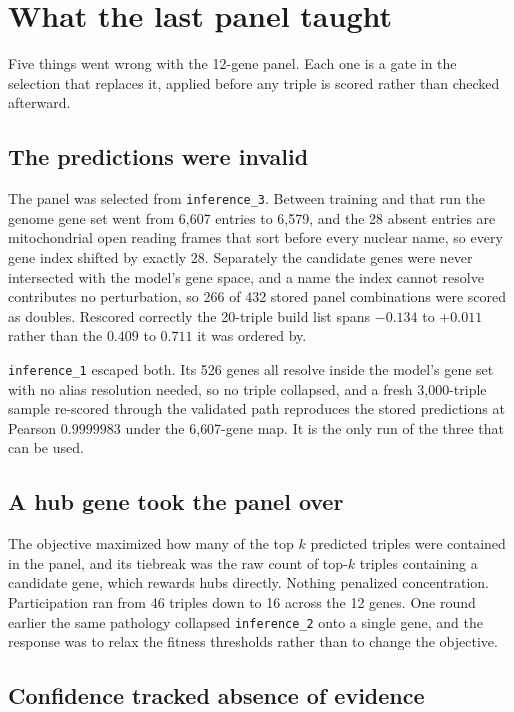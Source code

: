 \section{What the last panel taught}\label{sec:lessons}

Five things went wrong with the 12-gene panel. Each one is a gate in the
selection that replaces it, applied before any triple is scored rather than
checked afterward.

\subsection{The predictions were invalid}

The panel was selected from \texttt{inference\_3}. Between training and that run
the genome gene set went from 6{,}607 entries to 6{,}579, and the 28 absent
entries are mitochondrial open reading frames that sort before every nuclear
name, so every gene index shifted by exactly 28. Separately the candidate genes
were never intersected with the model's gene space, and a name the index cannot
resolve contributes no perturbation, so 266 of 432 stored panel combinations were
scored as doubles. Rescored correctly the 20-triple build list spans $-0.134$ to
$+0.011$ rather than the $0.409$ to $0.711$ it was ordered by.

\texttt{inference\_1} escaped both. Its 526 genes all resolve inside the model's
gene set with no alias resolution needed, so no triple collapsed, and a fresh
3{,}000-triple sample re-scored through the validated path reproduces the stored
predictions at Pearson $0.9999983$ under the 6{,}607-gene map. It is the only run
of the three that can be used.

\subsection{A hub gene took the panel over}

The objective maximized how many of the top $k$ predicted triples were contained
in the panel, and its tiebreak was the raw count of top-$k$ triples containing a
candidate gene, which rewards hubs directly. Nothing penalized concentration.
Participation ran from 46 triples down to 16 across the 12 genes. One round
earlier the same pathology collapsed \texttt{inference\_2} onto a single gene,
and the response was to relax the fitness thresholds rather than to change the
objective.

\subsection{Confidence tracked absence of evidence}

